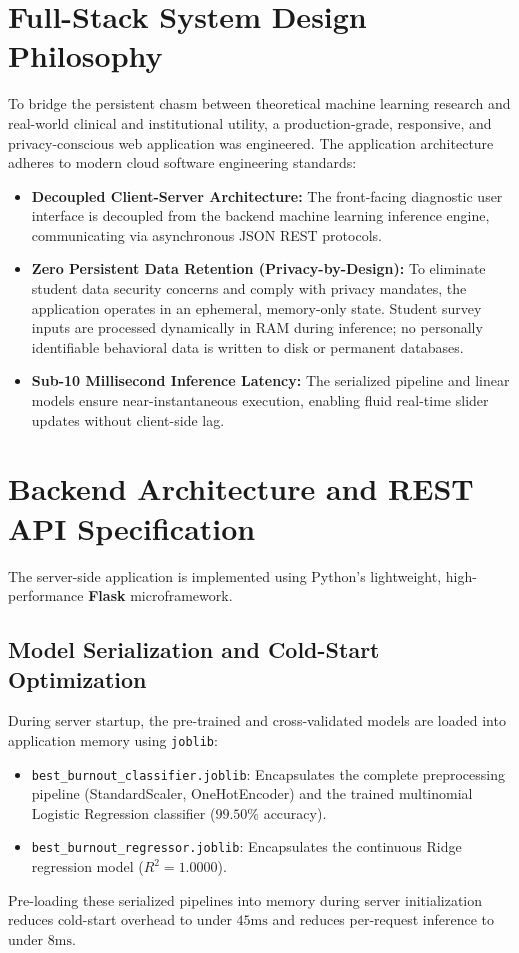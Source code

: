 \documentclass[12pt,a4paper,oneside]{report}
\begin{document}
\section{Full-Stack System Design Philosophy}
\label{sec:system_design_philosophy}
To bridge the persistent chasm between theoretical machine learning research and real-world clinical and institutional utility, a production-grade, responsive, and privacy-conscious web application was engineered. The application architecture adheres to modern cloud software engineering standards:
\begin{itemize}
    \item \textbf{Decoupled Client-Server Architecture:} The front-facing diagnostic user interface is decoupled from the backend machine learning inference engine, communicating via asynchronous JSON REST protocols.
    \item \textbf{Zero Persistent Data Retention (Privacy-by-Design):} To eliminate student data security concerns and comply with privacy mandates, the application operates in an ephemeral, memory-only state. Student survey inputs are processed dynamically in RAM during inference; no personally identifiable behavioral data is written to disk or permanent databases.
    \item \textbf{Sub-10 Millisecond Inference Latency:} The serialized pipeline and linear models ensure near-instantaneous execution, enabling fluid real-time slider updates without client-side lag.
\end{itemize}

\section{Backend Architecture and REST API Specification}
\label{sec:backend_api}
The server-side application is implemented using Python's lightweight, high-performance \textbf{Flask} microframework. 

\subsection{Model Serialization and Cold-Start Optimization}
During server startup, the pre-trained and cross-validated models are loaded into application memory using \texttt{joblib}:
\begin{itemize}
    \item \texttt{best\_burnout\_classifier.joblib}: Encapsulates the complete preprocessing pipeline (StandardScaler, OneHotEncoder) and the trained multinomial Logistic Regression classifier ($99.50\%$ accuracy).
    \item \texttt{best\_burnout\_regressor.joblib}: Encapsulates the continuous Ridge regression model ($R^2 = 1.0000$).
\end{itemize}
Pre-loading these serialized pipelines into memory during server initialization reduces cold-start overhead to under $45\text{ms}$ and reduces per-request inference to under $8\text{ms}$.
\end{document}
